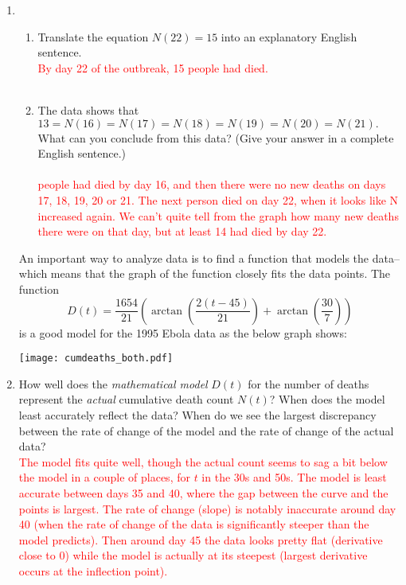 \documentclass[letterpaper,11pt]{article}
\newcommand{\sol}[1]{\textcolor{red}{#1}}
\newcommand{\sol}[1]{\textcolor{white}{#1}}
\begin{document}
\begin{enumerate}

\item 
\begin{enumerate}

\item Translate the equation $N(22)=15$ into an explanatory English sentence.\\

\sol{\quad By day 22 of the outbreak, 15 people had died.\\\\}


\item The data shows that $13=N(16)=N(17)=N(18)=N(19)=N(20)=N(21).$ What can you conclude from this data? (Give your answer in a complete English sentence.)\\\\

\sol{ people had died by day 16, and then there were no new deaths on days 17, 18, 19, 20 or 21.  The next person died on day 22, when it looks like N increased again.  We can't quite tell from the graph how many new deaths there were on that day, but at least 14 had died by day 22.}

\end{enumerate}

\newpage

An important way to analyze data is to find a function that models the data--which means that the graph of the function closely fits the data points.
The function
\[D(t)=\frac{1654}{21} \left( \arctan \left( \frac{2(t-45)}{21} \right)+ \arctan \left( \frac{30}{7} \right) \right) \]
is a good model for the 1995 Ebola data as the below graph shows:

\texttt{[image: cumdeaths\_both.pdf]}

\item How well does the {\it mathematical model} $D(t)$ for the number of deaths represent the {\it actual} cumulative death count $N(t)$?    When does the model least accurately reflect the data?  When do we see the largest discrepancy between the rate of change of the model and the rate of change of the actual data?  \\
\sol{The model fits quite well, though the actual count seems to sag a bit below the model in a couple of places, for $t$ in the 30s and 50s.  The model is least accurate between days 35 and 40, where the gap between the curve and the points is largest. The rate of change (slope) is notably inaccurate around day 40 (when the rate of change of the data is significantly steeper than the model predicts).  Then around day 45 the data looks pretty flat (derivative close to 0) while the model is actually at its steepest (largest derivative occurs at the inflection point).}


\end{enumerate}
\end{document}
